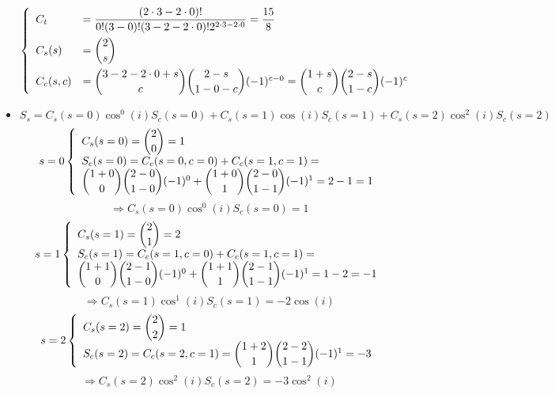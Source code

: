 \begin{itemize}
			\begin{equation}
			\left\{ \begin{array}{ll}
			C_t 		 & = \dfrac{(2\cdot 3 - 2\cdot 0)!}{0! (3-0)! (3 - 2 - 2\cdot 0)! 2^{2\cdot 3 - 2\cdot 0}} = \dfrac{15}{8} \\[1em]
			C_s(s) 		 & =  \dbinom{2}{s} \\[1em]
			C_c(s, c) 		 & =  \dbinom{3 - 2 - 2\cdot 0 + s}{c} \dbinom{2 - s}{1 - 0- c} (-1)^{c - 0} =  \dbinom{1 + s}{c} \dbinom{2 - s}{1 - c} (-1)^{c}
			\end{array}\right.
			\end{equation}
			\item[\GMVred{Step 4. }] 
			\[S_s = C_s(s = 0)\cos^0(i) S_c(s = 0) + C_s(s = 1)\cos(i)  S_c(s = 1) + C_s(s = 2)\cos^2(i)  S_c(s = 2)\]
			\[
			s = 0 \left\{ \begin{array}{lll} 
			C_s(s = 0) =  \dbinom{2}{0} = 1 \\
			S_c(s = 0) = C_c(s = 0, c = 0) + C_c(s = 1, c = 1) = \\
			 \dbinom{1 + 0}{0} \dbinom{2 - 0}{1 - 0} (-1)^{0} +  \dbinom{1 + 0}{1} \dbinom{2 - 0}{1 - 1} (-1)^{1} = 2 - 1 = 1
			\end{array}\right.
			\] 
			\begin{equation}
			\Rightarrow C_s(s = 0)\cos^0 (i) S_c(s = 0) = 1
			\label{eqs:s=0}
			\end{equation}
			\[
			s = 1 \left\{ \begin{array}{lll} 
			C_s(s = 1) =  \dbinom{2}{1} = 2 \\
			S_c(s = 1) = C_c(s = 1, c = 0) + C_c(s = 1, c = 1) = \\ \dbinom{1 + 1}{0} \dbinom{2 - 1}{1 - 0} (-1)^{0} +  \dbinom{1 + 1}{1} \dbinom{2 - 1}{1 - 1} (-1)^{1} = 1 - 2 = -1
			\end{array}\right.
			\]
			\begin{equation}
			\Rightarrow C_s(s = 1) \cos^1 (i) S_c(s = 1) = -2\cos(i)
			\label{eqs:s=1}
			\end{equation}
			\[
			s = 2 \left\{ \begin{array}{lll} 
			C_s(s = 2) =  \dbinom{2}{2} = 1 \\
			S_c(s = 2) = C_c(s = 2, c = 1) =  \dbinom{1 + 2}{1} \dbinom{2 - 2}{1 - 1} (-1)^{1}  = -3
			\end{array}\right.
			\]
			\begin{equation}
			\Rightarrow C_s(s = 2) \cos^2 (i) S_c(s = 2) = -3\cos^2(i)

\end{equation}
\end{itemize}
